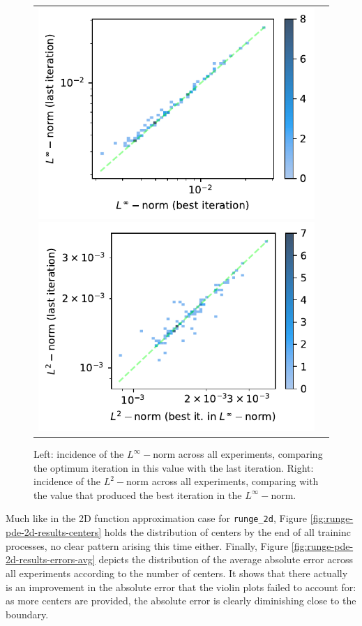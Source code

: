 \documentclass[12pt]{report} %
\begin{document}
\begin{figure}
  \hspace*{-2cm}
  \begin{tabular}{cc}
    \includegraphics[width=.6\textwidth]{imagenes/experiments/2d/pde_runge_2d/incidence_of_linf_runge_2d.pdf}
    \includegraphics[width=.6\textwidth]{imagenes/experiments/2d/pde_runge_2d/incidence_of_l2_runge_2d.pdf}
  \end{tabular}
  \caption{Left: incidence of the $L^\infty-$norm across all experiments, comparing the optimum iteration in this value with the last iteration. Right: incidence of the $L^2-$norm across all experiments, comparing with the value that produced the best iteration in the $L^\infty-$norm.}
  \label{fig:runge-pde-2d-results-incidence-l-norms}
\end{figure}

Much like in the 2D function approximation case for \texttt{runge\_2d}, Figure \ref{fig:runge-pde-2d-results-centers} holds the distribution of centers by the end of all traininc processes, no clear pattern arising this time either. Finally, Figure \ref{fig:runge-pde-2d-results-errors-avg} depicts the distribution of the average absolute error across all experiments according to the number of centers. It shows that there actually is an improvement in the absolute error that the violin plots failed to account for: as more centers are provided, the absolute error is clearly diminishing close to the boundary.
\end{document}
